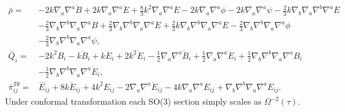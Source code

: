 \documentclass[10pt,letterpaper]{article}
\numberwithin{equation}{subsection}
\begin{document}
\begin{align}
\bar \rho={}&-2 k \nabla_{a}\nabla^{a}\dot{B}
 + 2 k \nabla_{a}\nabla^{a}\ddot{E}
 + \tfrac{8}{3} k^2 \nabla_{a}\nabla^{a}E
 - 2 k \nabla_{a}\nabla^{a}\phi
 - 2 k \nabla_{a}\nabla^{a}\psi
 -  \tfrac{2}{3} k \nabla_{b}\nabla_{a}\nabla^{b}\nabla^{a}E\nonumber\\
& -  \tfrac{2}{3} \nabla_{b}\nabla^{b}\nabla_{a}\nabla^{a}\dot{B}
 + \tfrac{2}{3} \nabla_{b}\nabla^{b}\nabla_{a}\nabla^{a}\ddot{E}
 + \tfrac{2}{3} k \nabla_{b}\nabla^{b}\nabla_{a}\nabla^{a}E
 -  \tfrac{2}{3} \nabla_{b}\nabla^{b}\nabla_{a}\nabla^{a}\phi\nonumber\\
& -  \tfrac{2}{3} \nabla_{b}\nabla^{b}\nabla_{a}\nabla^{a}\psi,
\nonumber\\
\bar Q_i={}& -2 k^2 B_{i}
 -  k \ddot{B}_{i}
 + k \dddot{E}_{i}
 + 2 k^2 \dot{E}_{i}
 -  \tfrac{1}{2} \nabla_{a}\nabla^{a}\ddot{B}_{i}
 + \tfrac{1}{2} \nabla_{a}\nabla^{a}\dddot{E}_{i}
 + \tfrac{1}{2} \nabla_{b}\nabla^{b}\nabla_{a}\nabla^{a}B_{i}\nonumber\\
& -  \tfrac{1}{2} \nabla_{b}\nabla^{b}\nabla_{a}\nabla^{a}\dot{E}_{i},
\nonumber\\
\bar \pi_{ij}^{T\theta}={}& \overset{\text{...}.}{E}_{ij}
 + 8 k \ddot{E}_{ij}
 + 4 k^2 E_{ij}
 - 2 \nabla_{a}\nabla^{a}\ddot{E}_{ij}
 - 4 k \nabla_{a}\nabla^{a}E_{ij}
 + \nabla_{b}\nabla^{b}\nabla_{a}\nabla^{a}E_{ij}.
\end{align}
Under conformal transformation each SO(3) section simply scales as $\Omega^{-2}(\tau)$. 
\end{document}
